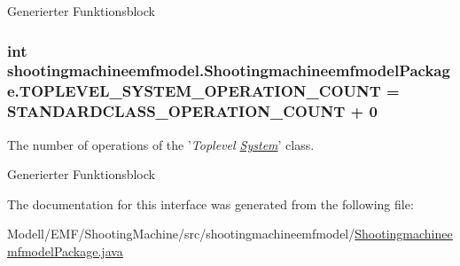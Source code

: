 Generierter Funktionsblock  \hypertarget{interfaceshootingmachineemfmodel_1_1_shootingmachineemfmodel_package_ab9e94cf3384c47a0b63a1069e6879fb0}{
\subsubsection[{T\-O\-P\-L\-E\-V\-E\-L\-\_\-\-S\-Y\-S\-T\-E\-M\-\_\-\-O\-P\-E\-R\-A\-T\-I\-O\-N\-\_\-\-C\-O\-U\-N\-T}]{\setlength{\rightskip}{0pt plus 5cm}int shootingmachineemfmodel.\-Shootingmachineemfmodel\-Package.\-T\-O\-P\-L\-E\-V\-E\-L\-\_\-\-S\-Y\-S\-T\-E\-M\-\_\-\-O\-P\-E\-R\-A\-T\-I\-O\-N\-\_\-\-C\-O\-U\-N\-T = {\bf S\-T\-A\-N\-D\-A\-R\-D\-C\-L\-A\-S\-S\-\_\-\-O\-P\-E\-R\-A\-T\-I\-O\-N\-\_\-\-C\-O\-U\-N\-T} + 0}}\label{interfaceshootingmachineemfmodel_1_1_shootingmachineemfmodel_package_ab9e94cf3384c47a0b63a1069e6879fb0}
The number of operations of the '{\itshape Toplevel \hyperlink{interfaceshootingmachineemfmodel_1_1_system}{System}}' class.

Generierter Funktionsblock  

The documentation for this interface was generated from the following file\-:\begin{DoxyCompactItemize}
\item 
Modell/\-E\-M\-F/\-Shooting\-Machine/src/shootingmachineemfmodel/\hyperlink{_shootingmachineemfmodel_package_8java}{Shootingmachineemfmodel\-Package.\-java}\end{DoxyCompactItemize}
